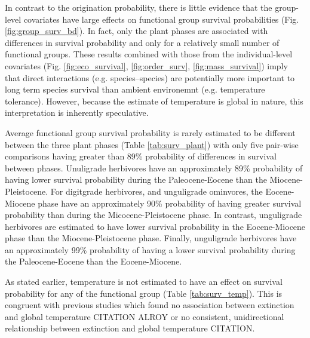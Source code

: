 \documentclass[12pt,letterpaper]{article}
\begin{document}
In contrast to the origination probability, there is little evidence that the group-level covariates have large effects on functional group survival probabilities (Fig. \ref{fig:group_surv_bd}). In fact, only the plant phases are associated with differences in survival probability and only for a relatively small number of functional groups. These results combined with those from the individual-level covariates (Fig. \ref{fig:eco_survival}, \ref{fig:order_surv}, \ref{fig:mass_survival}) imply that direct interactions (e.g. species--species) are potentially more important to long term species survival than ambient environemnt (e.g. temperature tolerance). However, because the estimate of temperature is global in nature, this interpretation is inherently speculative.

Average functional group survival probability is rarely estimated to be different between the three plant phases (Table \ref{tab:surv_plant}) with only five pair-wise comparisons having greater than 89\% probability of differences in survival between phases. Unuligrade herbivores have an approximately 89\% probability of having lower survival probability during the Paleocene-Eocene than the Miocene-Pleistocene. For digitgrade herbivores, and unguligrade ominvores, the Eocene-Miocene phase have an approximately 90\% probability of having greater survival probability than during the Micocene-Pleistocene phase. In contrast, unguligrade herbivores are estimated to have lower survival probability in the Eocene-Miocene phase than the Miocene-Pleistocene phase. Finally, unguligrade herbivores have an approximately 99\% probability of having a lower survival probability during the Paleocene-Eocene than the Eocene-Miocene.

As stated earlier, temperature is not estimated to have an effect on survival probability for any of the functional group (Table \ref{tab:surv_temp}). This is congruent with previous studies which found no association between extinction and global temperature CITATION ALROY or no consistent, unidirectional relationship between extinction and global temperature CITATION. 
\end{document}
